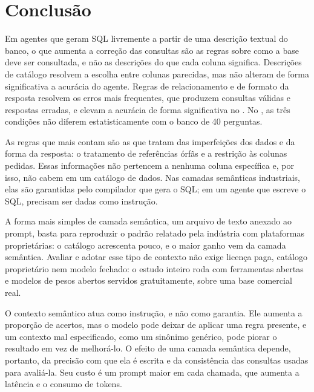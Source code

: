 \chapter{Conclusão}
\label{cap:conclusao}

Em agentes que geram SQL livremente a partir de uma descrição textual do
banco, o que aumenta a correção das consultas são as regras sobre como a
base deve ser consultada, e não as descrições do que cada coluna
significa. Descrições de catálogo resolvem a escolha entre colunas
parecidas, mas não alteram de forma significativa a acurácia do agente.
Regras de relacionamento e de formato da resposta resolvem os
erros mais frequentes, que produzem consultas válidas e respostas
erradas, e elevam a acurácia de forma significativa no
. No , as três condições não diferem
estatisticamente com o banco de 40 perguntas.

As regras que mais contam são as que tratam das imperfeições dos dados e
da forma da resposta: o tratamento de referências órfãs e a restrição às
colunas pedidas. Essas informações não pertencem a nenhuma coluna
específica e, por isso, não cabem em um catálogo de dados. Nas camadas
semânticas industriais, elas são garantidas pelo compilador que gera o
SQL; em um agente que escreve o SQL, precisam ser dadas como instrução.

A forma mais simples de camada semântica, um arquivo de texto anexado ao
prompt, basta para reproduzir o padrão relatado pela indústria com
plataformas proprietárias: o catálogo acrescenta pouco, e o maior ganho
vem da camada semântica. Avaliar e adotar esse tipo de contexto não exige
licença paga, catálogo proprietário nem modelo fechado: o estudo inteiro
roda com ferramentas abertas e modelos de pesos abertos servidos
gratuitamente, sobre uma base comercial real.

O contexto semântico atua como instrução, e não como garantia. Ele
aumenta a proporção de acertos, mas o modelo pode deixar de aplicar uma
regra presente, e um contexto mal especificado, como um sinônimo
genérico, pode piorar o resultado em vez de melhorá-lo. O efeito de uma camada
semântica depende, portanto, da precisão com que ela é escrita e da
consistência das consultas usadas para avaliá-la. Seu custo é um prompt
maior em cada chamada, que aumenta a latência e o consumo de tokens.

